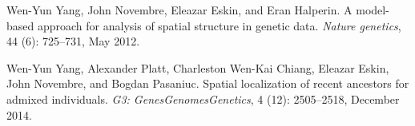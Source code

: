 \documentclass[10pt,letterpaper]{article}
\begin{document}
\begin{thebibliography}{80}
Wen-Yun Yang, John Novembre, Eleazar Eskin, and Eran Halperin.
\newblock A model-based approach for analysis of spatial structure in genetic
  data.
\newblock \emph{Nature genetics}, 44 (6): 725--731, May 2012.

Wen-Yun Yang, Alexander Platt, Charleston Wen-Kai Chiang, Eleazar Eskin, John
  Novembre, and Bogdan Pasaniuc.
\newblock Spatial localization of recent ancestors for admixed individuals.
\newblock \emph{G3: Genes{\textbar}Genomes{\textbar}Genetics}, 4
  (12): 2505--2518, December 2014.

\end{thebibliography}

\end{document}
